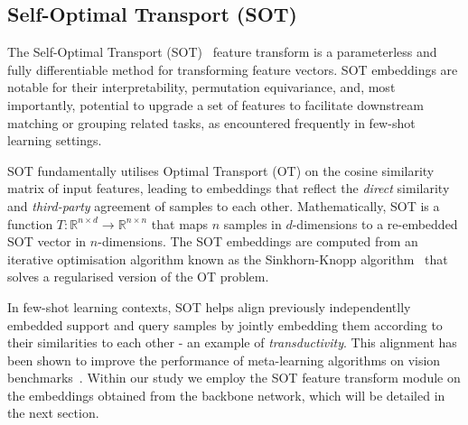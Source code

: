 \subsection{Self-Optimal Transport (SOT)}


The Self-Optimal Transport (SOT)~\cite{sot} feature transform is a parameterless and fully differentiable method for transforming feature vectors. SOT embeddings are notable for their interpretability, permutation equivariance, and, most importantly, potential to upgrade a set of features to facilitate downstream matching or grouping related tasks, as encountered frequently in few-shot learning settings.

SOT fundamentally utilises Optimal Transport (OT) on the cosine similarity matrix of input features, leading to embeddings that reflect the \textit{direct} similarity and \textit{third-party} agreement of samples to each other. Mathematically, SOT is a function \(T: \mathbb{R}^{n \times d} \rightarrow \mathbb{R}^{n \times n}\) that maps \(n\) samples in \(d\)-dimensions to a re-embedded SOT vector in \(n\)-dimensions. The SOT embeddings are computed from an iterative optimisation algorithm known as the Sinkhorn-Knopp algorithm~\cite{sinkhorn-knopp} that solves a regularised version of the OT problem.

In few-shot learning contexts, SOT helps align previously independentlly embedded support and query samples by jointly embedding them according to their similarities to each other - an example of \textit{transductivity}. This alignment has been shown to improve the performance of meta-learning algorithms on vision benchmarks~\cite{sot}. Within our study we employ the SOT feature transform module on the embeddings obtained from the backbone network, which will be detailed in the next section.



